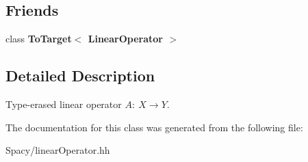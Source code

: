 \subsection*{Friends}
\begin{DoxyCompactItemize}
\item 
\hypertarget{classSpacy_1_1LinearOperator_ae29ffe0f98f8931b8566b9be964173a8}{}class {\bfseries To\+Target$<$ Linear\+Operator $>$}\label{classSpacy_1_1LinearOperator_ae29ffe0f98f8931b8566b9be964173a8}

\end{DoxyCompactItemize}


\subsection{Detailed Description}
Type-\/erased linear operator $A:\ X \to Y $. 

The documentation for this class was generated from the following file\+:\begin{DoxyCompactItemize}
\item 
Spacy/linear\+Operator.\+hh\end{DoxyCompactItemize}
